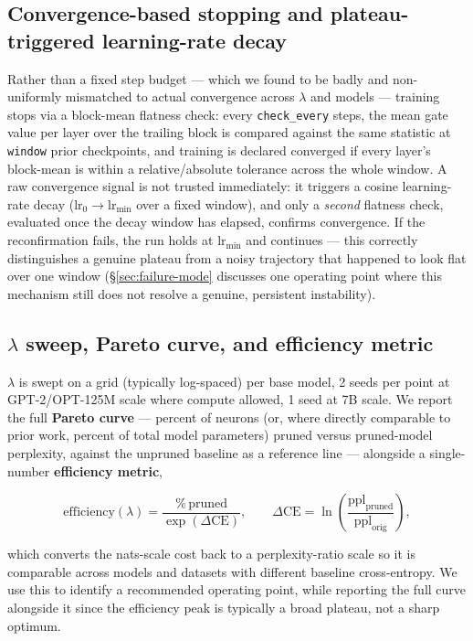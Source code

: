 \documentclass[11pt]{article}
\begin{document}
\subsection{Convergence-based stopping and plateau-triggered learning-rate decay}
\label{sec:convergence}

Rather than a fixed step budget --- which we found to be badly and
non-uniformly mismatched to actual convergence across $\lambda$ and models ---
training stops via a block-mean flatness check: every \texttt{check\_every} steps,
the mean gate value per layer over the trailing block is compared against
the same statistic at \texttt{window} prior checkpoints, and training is declared
converged if every layer's block-mean is within a relative/absolute
tolerance across the whole window. A raw convergence signal is not trusted
immediately: it triggers a cosine learning-rate decay
($\mathrm{lr}_0 \to \mathrm{lr}_{\min}$ over a fixed window), and only a
\emph{second} flatness check, evaluated once the decay window has elapsed, confirms
convergence. If the reconfirmation fails, the run holds at $\mathrm{lr}_{\min}$
and continues --- this correctly distinguishes a genuine plateau from a
noisy trajectory that happened to look flat over one window (\S\ref{sec:failure-mode} discusses
one operating point where this mechanism still does not resolve a genuine,
persistent instability).

\subsection{\texorpdfstring{$\lambda$}{lambda} sweep, Pareto curve, and efficiency metric}
\label{sec:lambda-sweep}

$\lambda$ is swept on a grid (typically log-spaced) per base model, 2 seeds
per point at GPT-2/OPT-125M scale where compute allowed, 1 seed at 7B scale.
We report the full \textbf{Pareto curve} --- percent of neurons (or, where directly
comparable to prior work, percent of total model parameters) pruned versus
pruned-model perplexity, against the unpruned baseline as a reference line ---
alongside a single-number \textbf{efficiency metric},

\begin{equation}
\mathrm{efficiency}(\lambda) = \frac{\%\,\text{pruned}}{\exp(\Delta\mathrm{CE})}, \qquad \Delta\mathrm{CE} = \ln\!\left(\frac{\mathrm{ppl}_{\text{pruned}}}{\mathrm{ppl}_{\text{orig}}}\right),
\end{equation}

which converts the nats-scale cost back to a perplexity-ratio scale so it is
comparable across models and datasets with different baseline cross-entropy.
We use this to identify a recommended operating point, while reporting the
full curve alongside it since the efficiency peak is typically a broad
plateau, not a sharp optimum.
\end{document}

